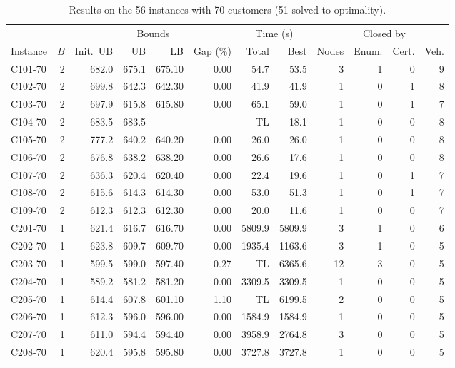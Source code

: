 \documentclass[10pt]{article}
\begin{document}
\begin{table}[p]
\centering
\caption{Results on the 56 instances with 70 customers (51 solved to optimality).}
\label{tab:n70}
\footnotesize
\setlength{\tabcolsep}{5pt}
\begin{tabular}{lrrrrrrrrrrr}
\toprule
 & & \multicolumn{4}{c}{Bounds} & \multicolumn{2}{c}{Time (s)} & & \multicolumn{2}{c}{Closed by} & \\
\cmidrule(lr){3-6}\cmidrule(lr){7-8}\cmidrule(lr){10-11}
Instance & $B$ & Init.\ UB & UB & LB & Gap (\%) & Total & Best & Nodes & Enum. & Cert. & Veh. \\
\midrule
C101-70 & 2 & 682.0 & 675.1 & 675.10 & 0.00 & 54.7 & 53.5 & 3 & 1 & 0 & 9 \\
C102-70 & 2 & 699.8 & 642.3 & 642.30 & 0.00 & 41.9 & 41.9 & 1 & 0 & 1 & 8 \\
C103-70 & 2 & 697.9 & 615.8 & 615.80 & 0.00 & 65.1 & 59.0 & 1 & 0 & 1 & 7 \\
C104-70 & 2 & 683.5 & 683.5 & -- & -- & TL & 18.1 & 1 & 0 & 0 & 8 \\
C105-70 & 2 & 777.2 & 640.2 & 640.20 & 0.00 & 26.0 & 26.0 & 1 & 0 & 0 & 8 \\
C106-70 & 2 & 676.8 & 638.2 & 638.20 & 0.00 & 26.6 & 17.6 & 1 & 0 & 0 & 8 \\
C107-70 & 2 & 636.3 & 620.4 & 620.40 & 0.00 & 22.4 & 19.6 & 1 & 0 & 1 & 7 \\
C108-70 & 2 & 615.6 & 614.3 & 614.30 & 0.00 & 53.0 & 51.3 & 1 & 0 & 1 & 7 \\
C109-70 & 2 & 612.3 & 612.3 & 612.30 & 0.00 & 20.0 & 11.6 & 1 & 0 & 0 & 7 \\
\midrule
C201-70 & 1 & 621.4 & 616.7 & 616.70 & 0.00 & 5809.9 & 5809.9 & 3 & 1 & 0 & 6 \\
C202-70 & 1 & 623.8 & 609.7 & 609.70 & 0.00 & 1935.4 & 1163.6 & 3 & 1 & 0 & 5 \\
C203-70 & 1 & 599.5 & 599.0 & 597.40 & 0.27 & TL & 6365.6 & 12 & 3 & 0 & 5 \\
C204-70 & 1 & 589.2 & 581.2 & 581.20 & 0.00 & 3309.5 & 3309.5 & 1 & 0 & 0 & 5 \\
C205-70 & 1 & 614.4 & 607.8 & 601.10 & 1.10 & TL & 6199.5 & 2 & 0 & 0 & 5 \\
C206-70 & 1 & 612.3 & 596.0 & 596.00 & 0.00 & 1584.9 & 1584.9 & 1 & 0 & 0 & 5 \\
C207-70 & 1 & 611.0 & 594.4 & 594.40 & 0.00 & 3958.9 & 2764.8 & 3 & 0 & 0 & 5 \\
C208-70 & 1 & 620.4 & 595.8 & 595.80 & 0.00 & 3727.8 & 3727.8 & 1 & 0 & 0 & 5 \\

\end{tabular}
\end{table}
\end{document}
